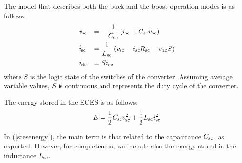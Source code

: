 \documentclass[journal, a4paper]{IEEEtran}
\begin{document}
The model that describes both the buck and the boost operation modes
is as follows:
\begin{alignat}{3}
  \nonumber & \dot{v}_{\rm sc} &=& -\frac{1}{C_{\rm sc}} \left( i_{\rm sc} 
    + G_{\rm sc} v_{\rm sc} \right) \\
  \label{scesmodel}
  & \dot{i}_{\rm sc} &=& \ \frac{1}{L_{\rm sc}} \left( v_{\rm sc} -
    i_{\rm sc} R_{\rm sc} - v_{\rm dc} S \right) \\
  \nonumber & i_{\rm dc} &=& \ S i_{\rm sc}  
\end{alignat}
where $S$ is the logic state of the switches of the converter. Assu\-ming
average variable values, $S$ is continuous and 
re\-presents the duty cycle of the converter. 

The energy stored in the ECES is as follows: 
\begin{equation}
  E = \frac{1}{2} C_{\rm sc} v_{\rm sc}^2 + \frac{1}{2} L_{\rm sc}
  i_{\rm sc}^2
  \label{scesenergy}
\end{equation}

In (\ref{scesenergy}), the main term is that related to the
capacitance $C_{\rm sc}$, as expected.  However, for completeness, we
include also the energy stored in the inductance $L_{\rm sc}$.
\end{document}
